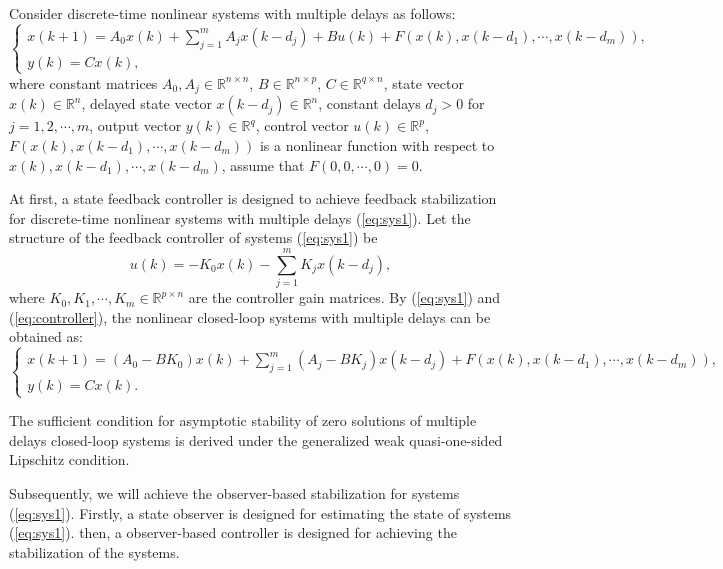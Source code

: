 \documentclass[12pt]{llncs}
\begin{document}
Consider discrete-time nonlinear systems with multiple delays as follows:
\begin{equation}\label{eq:sys1}
  \left\{
    \begin{array}{ll}
      x(k+1)=A_{0}x(k)+\sum_{j=1}^{m}A_{j}x(k-d_{j})+Bu(k)+F(x(k),x(k-d_{1}),\cdots,x(k-d_{m})),  \\
      y(k)=Cx(k),
    \end{array}
  \right.
\end{equation}
where constant matrices $A_{0},A_{j}\in \mathbb R^{n\times n}$, $B\in\mathbb R^{n\times p}$, $C\in\mathbb R^{q\times n}$, state vector $x(k)\in \mathbb R^{n}$, delayed state vector $x(k-d_{j})\in \mathbb R^{n}$, constant delays $d_{j}>0$ for $j=1,2,\cdots,m$, output vector $y(k)\in \mathbb R^{q}$, control vector $u(k)\in \mathbb R^{p}$, $F(x(k),x(k-d_{1}),\cdots,x(k-d_{m}))$ is a nonlinear function with respect to $x(k),x(k-d_{1}),\cdots, x(k-d_{m})$, assume that $F(0,0,\cdots,0)=0$.
\par At first, a state feedback controller is designed to achieve feedback stabilization for discrete-time nonlinear systems with multiple delays (\ref{eq:sys1}). Let the structure of the feedback controller of systems (\ref{eq:sys1}) be
\begin{equation}\label{eq:controller}
  u(k)=-K_{0}x(k)-\sum_{j=1}^{m}K_{j}x(k-d_{j}),
\end{equation}
where $K_{0},K_{1},\cdots,K_{m}\in \mathbb R^{p\times n}$ are the controller gain matrices. By (\ref{eq:sys1}) and (\ref{eq:controller}), the nonlinear closed-loop systems with multiple delays can be obtained as:
\begin{equation}\label{eq:clo1}
  \left\{
  \begin{array}{ll}
    x(k+1)=(A_{0}-BK_{0})x(k)+\sum_{j=1}^{m}(A_{j}-BK_{j})x(k-d_{j})+F(x(k),x(k-d_{1}),\cdots,x(k-d_{m})), \\
    y(k)=Cx(k).
  \end{array}
\right.
\end{equation}
\par The sufficient condition for asymptotic stability of zero solutions of multiple delays closed-loop systems is derived under the generalized weak quasi-one-sided Lipschitz condition.
\par Subsequently, we will achieve the observer-based stabilization for systems (\ref{eq:sys1}). Firstly, a state observer is designed for estimating the state of systems (\ref{eq:sys1}). then, a observer-based controller is designed for achieving the stabilization of the systems.
\end{document}
